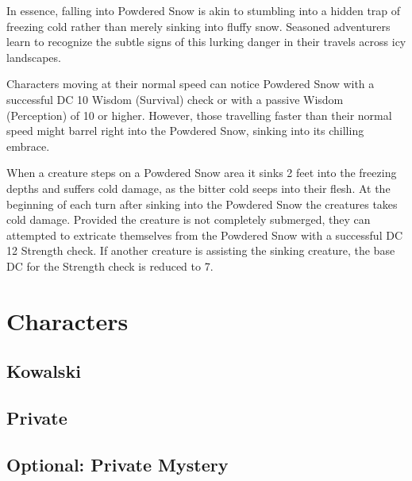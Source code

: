 In essence, falling into Powdered Snow is akin to stumbling into a hidden trap of freezing cold rather than merely sinking into fluffy snow. Seasoned adventurers learn to recognize the subtle signs of this lurking danger in their travels across icy landscapes.

Characters moving at their normal speed can notice Powdered Snow with a successful DC 10 Wisdom (Survival) check or with a passive Wisdom (Perception) of 10 or higher. However, those travelling faster than their normal speed might barrel right into the Powdered Snow, sinking into its chilling embrace.

When a creature steps on a Powdered Snow area it sinks 2 feet into the freezing depths and suffers  cold damage, as the bitter cold seeps into their flesh. At the beginning of each turn after sinking into the Powdered Snow the creatures takes  cold damage. Provided the creature is not completely submerged, they can attempted to extricate themselves from the Powdered Snow with a successful DC 12 Strength check. If another creature is assisting the sinking creature, the base DC for the Strength check is reduced to 7.

\chapter{Characters}
\renewcommand{\boolCharacterSheetImage}{true}
\section*{Kowalski}\clearpage{}
\clearpage
\section*{Private}
\clearpage
\section*{Optional: Private Mystery}
